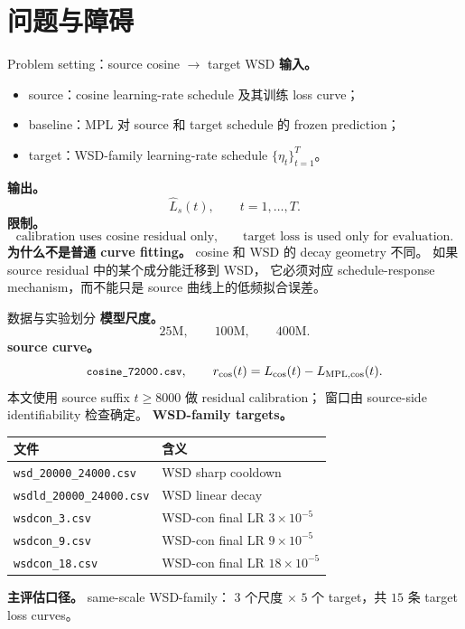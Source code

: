 \documentclass[9pt,aspectratio=169,fontset=fandol]{ctexbeamer}
\newcommand{\code}[1]{\texttt{\small #1}}
\newcommand{\tightlist}{\setlength{\itemsep}{2pt}\setlength{\parskip}{0pt}}
\begin{document}
\section{问题与障碍}

\begin{frame}{Problem setting：source cosine \(\rightarrow\) target WSD}
\small
\textbf{输入。}
\begin{itemize}\tightlist
\item source：cosine learning-rate schedule 及其训练 loss curve；
\item baseline：MPL 对 source 和 target schedule 的 frozen prediction；
\item target：WSD-family learning-rate schedule \(\{\eta_t\}_{t=1}^T\)。
\end{itemize}
\vfill
\textbf{输出。}
\[
\widehat L_s(t),\qquad t=1,\ldots,T.
\]
\vfill
\textbf{限制。}
\[
\text{calibration uses cosine residual only,}
\qquad
\text{target loss is used only for evaluation.}
\]
\vfill
\textbf{为什么不是普通 curve fitting。}
cosine 和 WSD 的 decay geometry 不同。
如果 source residual 中的某个成分能迁移到 WSD，
它必须对应 schedule-response mechanism，而不能只是 source 曲线上的低频拟合误差。
\end{frame}

\begin{frame}{数据与实验划分}
\footnotesize
\textbf{模型尺度。}
\[
25\mathrm{M},\qquad 100\mathrm{M},\qquad 400\mathrm{M}.
\]
\vfill
\textbf{source curve。}
\[
\code{cosine\_72000.csv},\qquad
r_{\cos}(t)=L_{\cos}(t)-L_{\mathrm{MPL},\cos}(t).
\]
本文使用 source suffix \(t\ge8000\) 做 residual calibration；
窗口由 source-side identifiability 检查确定。
\vfill
\textbf{WSD-family targets。}
\begin{center}\scriptsize
\begin{tabular}{ll}
\toprule
文件 & 含义\\
\midrule
\code{wsd\_20000\_24000.csv} & WSD sharp cooldown\\
\code{wsdld\_20000\_24000.csv} & WSD linear decay\\
\code{wsdcon\_3.csv} & WSD-con final LR \(3\times10^{-5}\)\\
\code{wsdcon\_9.csv} & WSD-con final LR \(9\times10^{-5}\)\\
\code{wsdcon\_18.csv} & WSD-con final LR \(18\times10^{-5}\)\\
\bottomrule
\end{tabular}
\end{center}
\vfill
\textbf{主评估口径。}
same-scale WSD-family：
\(3\) 个尺度 \(\times\) \(5\) 个 target，共 \(15\) 条 target loss curves。
\end{frame}
\end{document}
